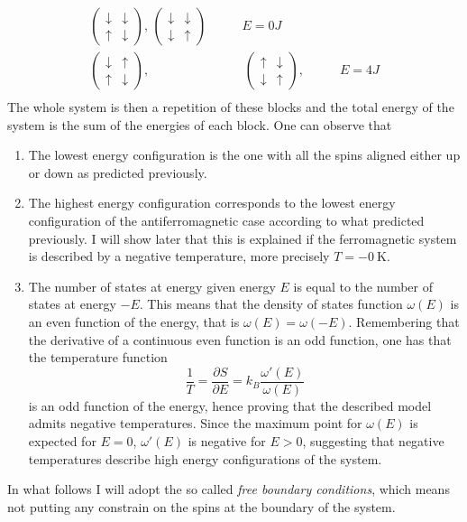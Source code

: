 \begin{align*}
    \begin{pmatrix} \downarrow & \downarrow \\ \uparrow & \downarrow \end{pmatrix}, \,
    \begin{pmatrix} \downarrow & \downarrow \\ \downarrow & \uparrow \end{pmatrix} \qquad &E = 0J \\
    \begin{pmatrix} \downarrow & \uparrow \\ \uparrow & \downarrow \end{pmatrix},& \,
    \begin{pmatrix} \uparrow & \downarrow \\ \downarrow & \uparrow \end{pmatrix}, \qquad &E = 4J \\
\end{align*}
The whole system is then a repetition of these blocks and the total energy of the system is the sum of the energies of each block. One can observe 
that 
\begin{enumerate}
    \item The lowest energy configuration is the one with all the spins aligned either up or down as predicted previously.
    \item The highest energy configuration corresponds to the lowest energy configuration of the antiferromagnetic case according to what predicted previously. I will show later that this 
    is explained if the ferromagnetic system is described by a negative temperature, more precisely $T = -\SI{0}{\kelvin}$.
    \item The number of states at energy given energy $E$ is equal to the number of states at energy $-E$. This means that the density of states function $\omega(E)$ is an even function 
    of the energy, that is $\omega(E) = \omega(-E)$. Remembering that the derivative of a continuous even function is an odd function, one has that the temperature function
    \begin{equation*}
        \frac{1}{T} = \frac{\partial S}{\partial E} = k_B \frac{\omega'(E)}{\omega(E)}
    \end{equation*}
    is an odd function of the energy, hence proving that the described model admits negative temperatures. Since the maximum point for $\omega(E)$ is expected for $E=0$, $\omega'(E)$ is negative for $E>0$,
    suggesting that negative temperatures describe high energy configurations of the system.
\end{enumerate}
In what follows I will adopt the so called \emph{free boundary conditions}, which means not putting any constrain on the spins at the boundary of the system.

